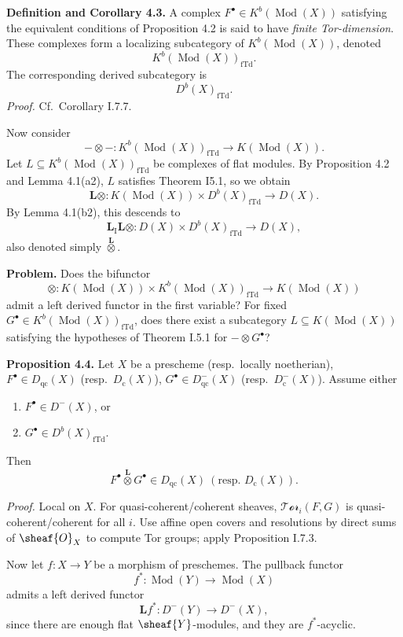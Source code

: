 \setcounter{page}{97}
\textbf{Definition and Corollary 4.3.}
A complex $F^\bullet\in K^b(\operatorname{Mod}(X))$ satisfying the equivalent conditions of Proposition 4.2 is said to have \textit{finite Tor-dimension}.
These complexes form a localizing subcategory of $K^b(\operatorname{Mod}(X))$, denoted
\[
K^b(\operatorname{Mod}(X))_{\mathrm{fTd}}.
\]
The corresponding derived subcategory is
\[
D^b(X)_{\mathrm{fTd}}.
\]
\textit{Proof.} Cf.\ Corollary I.7.7.

Now consider
\[
-\otimes-\colon K^b(\operatorname{Mod}(X))_{\mathrm{fTd}} \to K(\operatorname{Mod}(X)).
\]
Let $L\subseteq K^b(\operatorname{Mod}(X))_{\mathrm{fTd}}$ be complexes of flat modules.
By Proposition 4.2 and Lemma 4.1(a2), $L$ satisfies Theorem I5.1, so we obtain
\[
\mathbf{L}\otimes\colon K(\operatorname{Mod}(X)) \times D^b(X)_{\mathrm{fTd}} \to D(X).
\]
By Lemma 4.1(b2), this descends to
\[
\mathbf{L}_\mathrm{I}\mathbf{L}\otimes
\colon D(X)\times D^b(X)_{\mathrm{fTd}}\to D(X),
\]
also denoted simply $\stackrel{\mathbf{L}}{\otimes}$.

\setcounter{page}{98}
\textbf{Problem.}
Does the bifunctor
\[
\otimes\colon K(\operatorname{Mod}(X)) \times K^b(\operatorname{Mod}(X))_{\mathrm{fTd}}
\to K(\operatorname{Mod}(X))
\]
admit a left derived functor in the first variable?
For fixed $G^\bullet\in K^b(\operatorname{Mod}(X))_{\mathrm{fTd}}$, does there exist a subcategory $L\subseteq K(\operatorname{Mod}(X))$ satisfying the hypotheses of Theorem I.5.1 for $-\otimes G^\bullet$?

\textbf{Proposition 4.4.}
Let $X$ be a prescheme (resp.\ locally noetherian), $F^\bullet\in D_\mathrm{qc}(X)$ (resp.\ $D_\mathrm{c}(X)$),
$G^\bullet\in D_\mathrm{qc}^-(X)$ (resp.\ $D_\mathrm{c}^-(X)$).
Assume either
\begin{enumerate}
\item[(a)] $F^\bullet\in D^-(X)$, or
\item[(b)] $G^\bullet\in D^b(X)_{\mathrm{fTd}}$.
\end{enumerate}
Then
\[
F^\bullet\stackrel{\mathbf{L}}{\otimes} G^\bullet
\in D_\mathrm{qc}(X)\ (\text{resp. } D_\mathrm{c}(X)).
\]

\textit{Proof.}
Local on $X$. For quasi-coherent/coherent sheaves, $\mathcal{Tor}_i(F,G)$ is quasi-coherent/coherent for all $i$.
Use affine open covers and resolutions by direct sums of $\sheaf{O}_X$ to compute Tor groups; apply Proposition I.7.3.

\setcounter{page}{99}
Now let $f\colon X\to Y$ be a morphism of preschemes.
The pullback functor
\[
f^*\colon \operatorname{Mod}(Y)\to\operatorname{Mod}(X)
\]
admits a left derived functor
\[
\mathbf{L}f^*\colon D^-(Y)\to D^-(X),
\]
since there are enough flat $\sheaf{Y}$-modules, and they are $f^*$-acyclic.

